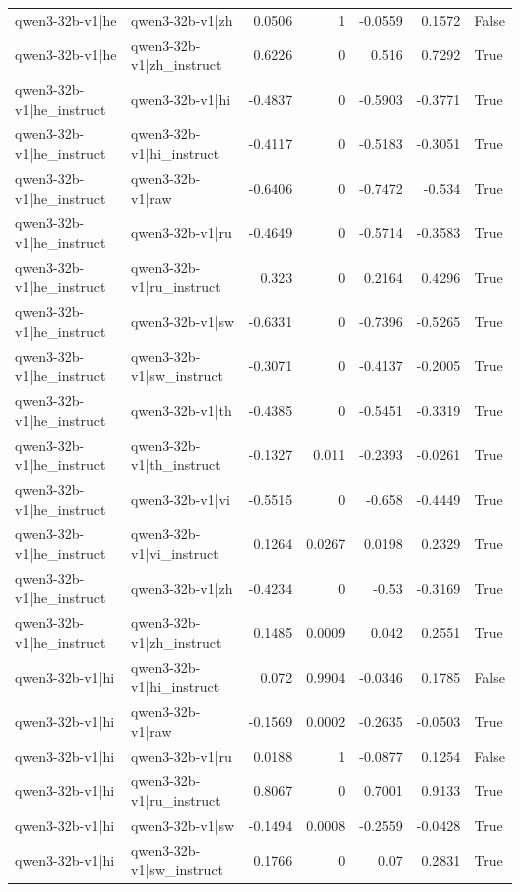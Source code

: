 \begin{table}
\begin{tabular}{l l r r r r l}
qwen3-32b-v1|he & qwen3-32b-v1|zh & 0.0506 & 1 & -0.0559 & 0.1572 & False \\
qwen3-32b-v1|he & qwen3-32b-v1|zh_instruct & 0.6226 & 0 & 0.516 & 0.7292 & True \\
qwen3-32b-v1|he_instruct & qwen3-32b-v1|hi & -0.4837 & 0 & -0.5903 & -0.3771 & True \\
qwen3-32b-v1|he_instruct & qwen3-32b-v1|hi_instruct & -0.4117 & 0 & -0.5183 & -0.3051 & True \\
qwen3-32b-v1|he_instruct & qwen3-32b-v1|raw & -0.6406 & 0 & -0.7472 & -0.534 & True \\
qwen3-32b-v1|he_instruct & qwen3-32b-v1|ru & -0.4649 & 0 & -0.5714 & -0.3583 & True \\
qwen3-32b-v1|he_instruct & qwen3-32b-v1|ru_instruct & 0.323 & 0 & 0.2164 & 0.4296 & True \\
qwen3-32b-v1|he_instruct & qwen3-32b-v1|sw & -0.6331 & 0 & -0.7396 & -0.5265 & True \\
qwen3-32b-v1|he_instruct & qwen3-32b-v1|sw_instruct & -0.3071 & 0 & -0.4137 & -0.2005 & True \\
qwen3-32b-v1|he_instruct & qwen3-32b-v1|th & -0.4385 & 0 & -0.5451 & -0.3319 & True \\
qwen3-32b-v1|he_instruct & qwen3-32b-v1|th_instruct & -0.1327 & 0.011 & -0.2393 & -0.0261 & True \\
qwen3-32b-v1|he_instruct & qwen3-32b-v1|vi & -0.5515 & 0 & -0.658 & -0.4449 & True \\
qwen3-32b-v1|he_instruct & qwen3-32b-v1|vi_instruct & 0.1264 & 0.0267 & 0.0198 & 0.2329 & True \\
qwen3-32b-v1|he_instruct & qwen3-32b-v1|zh & -0.4234 & 0 & -0.53 & -0.3169 & True \\
qwen3-32b-v1|he_instruct & qwen3-32b-v1|zh_instruct & 0.1485 & 0.0009 & 0.042 & 0.2551 & True \\
qwen3-32b-v1|hi & qwen3-32b-v1|hi_instruct & 0.072 & 0.9904 & -0.0346 & 0.1785 & False \\
qwen3-32b-v1|hi & qwen3-32b-v1|raw & -0.1569 & 0.0002 & -0.2635 & -0.0503 & True \\
qwen3-32b-v1|hi & qwen3-32b-v1|ru & 0.0188 & 1 & -0.0877 & 0.1254 & False \\
qwen3-32b-v1|hi & qwen3-32b-v1|ru_instruct & 0.8067 & 0 & 0.7001 & 0.9133 & True \\
qwen3-32b-v1|hi & qwen3-32b-v1|sw & -0.1494 & 0.0008 & -0.2559 & -0.0428 & True \\
qwen3-32b-v1|hi & qwen3-32b-v1|sw_instruct & 0.1766 & 0 & 0.07 & 0.2831 & True \\

\end{tabular}
\end{table}
